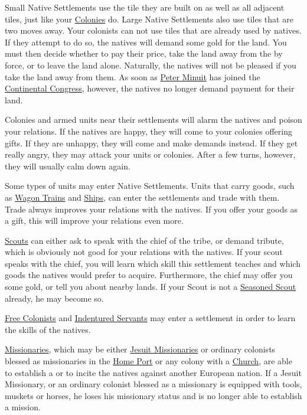 \documentclass[12pt]{article}
\begin{document}
Small Native Settlements use the tile they are built on as well as all
adjacent tiles, just like your \hyperlink{Colonies}{Colonies}
do. Large Native Settlements also use tiles that are two moves
away. Your colonists can not use tiles that are already used by
natives. If they attempt to do so, the natives will demand some gold
for the land. You must then decide whether to pay their price, take
the land away from the by force, or to leave the land alone.
Naturally, the natives will not be pleased if you take the land away
from them. As soon as \hyperlink{Peter Minuit}{Peter Minuit} has
joined the \hyperlink{Continental Congress}{Continental Congress},
however, the natives no longer demand payment for their land.

Colonies and armed units near their settlements will alarm the natives
and poison your relations. If the natives are happy, they will come to
your colonies offering gifts. If they are unhappy, they will come and
make demands instead. If they get really angry, they may attack your
units or colonies. After a few turns, however, they will usually calm
down again.

Some types of units may enter Native Settlements. Units that carry
goods, such as \hyperlink{Wagon Train}{Wagon Trains} and
\hyperlink{Naval Units}{Ships}, can enter the settlements and trade
with them. Trade always improves your relations with the natives. If
you offer your goods as a gift, this will improve your relations even
more.

\hyperlink{Scout}{Scouts} can either ask to speak with the chief of
the tribe, or demand tribute, which is obviously not good for your
relations with the natives. If your scout speaks with the chief, you
will learn which skill this settlement teaches and which goods the
natives would prefer to acquire. Furthermore, the chief may offer you
some gold, or tell you about nearby lands. If your Scout is not a
\hyperlink{Seasoned Scout}{Seasoned Scout} already, he may become so.

\hyperlink{Free Colonist}{Free Colonists} and \hyperlink{Indentured 
Servant}{Indentured Servants} may enter a settlement in order to learn
the skills of the natives. 

\hyperlink{Missionary}{Missionaries}, which may be either
\hyperlink{Jesuit Missionary}{Jesuit Missionaries} or ordinary
colonists blessed as missionaries in the \hyperlink{Home Port}{Home
  Port} or any colony with a \hyperlink{Church}{Church}, are able to
establish a  or to incite the natives against another
European nation. If a Jesuit Missionary, or an ordinary colonist
blessed as a missionary is equipped with tools, muskets or horses, he
loses his missionary status and is no longer able to establish a
mission.
\end{document}
